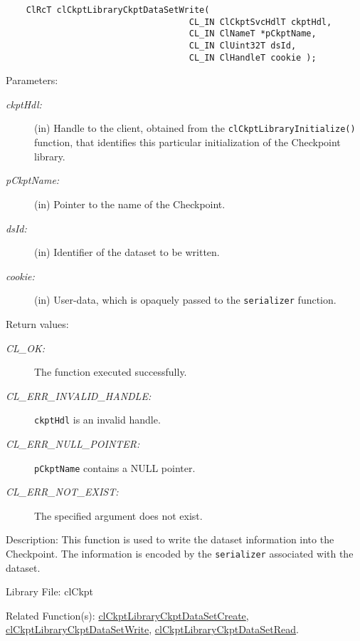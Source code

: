 \begin{flushleft}
\begin{Desc}
\footnotesize\begin{verbatim}    ClRcT clCkptLibraryCkptDataSetWrite(
                                	CL_IN ClCkptSvcHdlT ckptHdl,
                                	CL_IN ClNameT *pCkptName,
                                	CL_IN ClUint32T dsId,
                                	CL_IN ClHandleT cookie );
\end{verbatim}
\normalsize
\end{Desc}
\begin{Desc}
\item[Parameters:]
\begin{description}
\item[{\em ckpt\-Hdl:}](in) Handle to the client, obtained from the {\tt{clCkptLibraryInitialize()}} function, that identifies this particular 
initialization of the Checkpoint library. \item[{\em p\-Ckpt\-Name:}](in) Pointer to the name of the Checkpoint. 
\item[{\em ds\-Id:}](in) Identifier of the dataset 
to be written. \item[{\em cookie:}](in) User-data, which is opaquely passed to the {\tt{serializer}} function.\end{description}
\end{Desc}
\begin{Desc}
\item[Return values:]
\begin{description}
\item[{\em CL\_\-OK:}]The function executed successfully. 
\item[{\em CL\_\-ERR\_\-INVALID\_\-HANDLE:}]{\tt{ckptHdl}} is an invalid handle.
\item[{\em CL\_\-ERR\_\-NULL\_\-POINTER:}]{\tt{pCkptName}} contains a NULL pointer. 
\item[{\em CL\_\-ERR\_\-NOT\_\-EXIST:}]The specified argument does not exist.\end{description}
\end{Desc}
\begin{Desc}
\item[Description:]This function is used to write the dataset information into the Checkpoint. The information is encoded by the {\tt{serializer}}
associated with the dataset.\end{Desc}
\begin{Desc}
\item[Library File:]cl\-Ckpt\end{Desc}
\begin{Desc}
\item[Related Function(s):]\hyperlink{pageckpt205}{cl\-Ckpt\-Library\-Ckpt\-Data\-Set\-Create}, 
\hyperlink{pageckpt207}{cl\-Ckpt\-Library\-Ckpt\-Data\-Set\-Write}, \hyperlink{pageckpt208}{cl\-Ckpt\-Library\-Ckpt\-Data\-Set\-Read}.\end{Desc}
\newpage



\end{flushleft}

